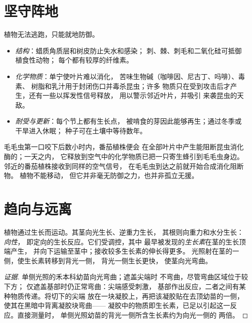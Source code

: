 \section{坚守阵地}

\begin{proposition}[有根生物的防御]\label{prop:g12:plant-rooted-life:defences}
植物无法逃跑，只能就地防御。
\begin{itemize}
  \item \emph{结构}：蜡质角质层和树皮防止失水和感染；
        刺、棘、刺毛和二氧化硅可抵御植食性动物；
        每个都有较厚的纤维素。
  \item \emph{化学物质}：单宁使叶片难以消化，
        苦味生物碱（咖啡因、尼古丁、吗啡）、毒素、
        树脂和乳汁用于封闭伤口并毒杀昆虫；许多
        物质只在受到攻击后才产生，还有一些以挥发性信号释放，
        用以警示邻近叶片，并吸引
        来袭昆虫的天敌。
  \item \emph{耐受与更新}：每个节上都有生长点，
        被啃食的芽因此能够再生；通过冬季或干旱进入休眠；
        种子可在土壤中等待数年。
\end{itemize}
\end{proposition}
\admitted

\begin{example}\label{ex:g12:plant-rooted-life:caterpillar}
毛毛虫第一口咬下后数小时内，番茄植株便会
在全部叶片中产生能阻断昆虫消化酶的；一天之内，
它释放到空气中的化学物质已把一只寄生蜂引到毛毛虫身边。
邻近的番茄植株接收到同样的空气信号，
在毛毛虫到达之前就开始合成消化阻断物。
植物不能移动，
但它并非毫无防御之力，也并非孤立无援。
\end{example}

\section{趋向与远离}

\begin{proposition}[生长即运动]\label{prop:g12:plant-rooted-life:tropisms}
植物通过生长而运动。其茎向光生长、逆重力生长，
其根则向重力和水分生长：\emph{向性}，
即定向的生长反应。它们受调控，其中
最早被发现的\emph{生长素}在茎的生长顶端产生，
并向下运输至茎中；接收较多生长素的伸长得更多。
光照射在茎的一侧，使生长素转移到背光一侧，
背光一侧生长更快，
使茎向光弯曲。
\end{proposition}
\begin{proof}[证据]
单侧光照的禾本科幼苗向光弯曲；遮盖尖端时
不弯曲，尽管弯曲区域位于较下方；
仅遮盖基部时仍正常弯曲：尖端感受刺激，
基部作出反应，二者之间有某种物质传递。将切下的尖端
放在一块凝胶上，再把该凝胶贴在去顶幼苗的一侧，
使其在黑暗中背离凝胶块弯曲——
凝胶中的物质即生长素，已足以引起这一反应。直接测量时，
单侧光照幼苗的背光一侧所含生长素约为向光一侧的
两倍。
\end{proof}

